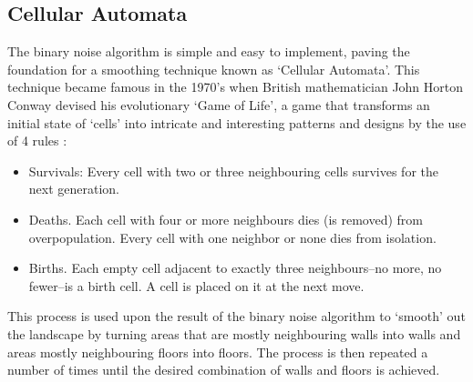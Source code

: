 \documentclass[12pt,a4paper]{article}
\begin{document}

\subsection{Cellular Automata}

The binary noise algorithm is simple and easy to implement, paving the foundation for a smoothing technique known as `Cellular Automata'. This technique became famous in the 1970's when British mathematician John Horton Conway devised his evolutionary `Game of Life', a game that transforms an initial state of `cells' into intricate and interesting patterns and designs by the use of 4 rules \cite{cellauto}: 

\begin{itemize}
	\item Survivals: Every cell with two or three neighbouring cells survives for the next generation.
	\item Deaths. Each cell with four or more neighbours dies (is removed) from overpopulation. Every cell with one neighbor or none dies from isolation.
	\item Births. Each empty cell adjacent to exactly three neighbours--no more, no fewer--is a birth cell. A cell is placed on it at the next move.
\end{itemize}

This process is used upon the result of the binary noise algorithm to `smooth' out the landscape by turning areas that are mostly neighbouring walls into walls and areas mostly neighbouring floors into floors. The process is then repeated a number of times until the desired combination of walls and floors is achieved. \\

\end{document}

